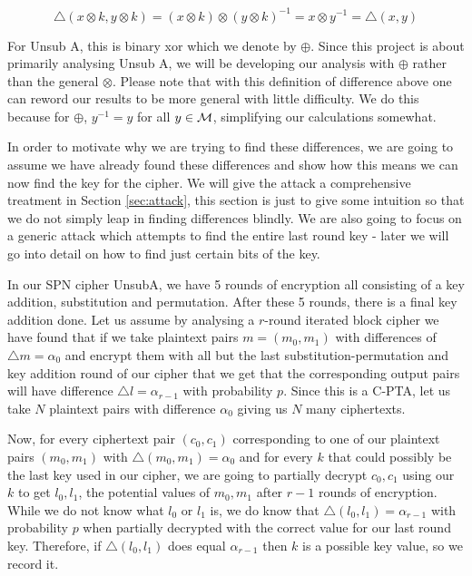 \documentclass[12pt,a4paper]{article}
\begin{document}
\[\triangle(x\otimes k,y\otimes k) = (x \otimes k) \otimes (y \otimes k)^{-1} =
x \otimes y^{-1} = \triangle(x,y)\]

For Unsub A, this is binary xor which we denote by $\oplus$. Since this project
is about primarily analysing Unsub A, we will be developing our analysis with
$\oplus$ rather than the general $\otimes$. Please note that with this
definition of difference above one can reword our results to be more general
with little difficulty. We do this because for $\oplus$, $y^{-1} = y$ for all
$y \in \cal{M}$, simplifying our calculations somewhat.

In order to motivate why we are trying to find these differences, we are going
to assume we have already found these differences and show how this means we
can now find the key for the cipher. We will give the attack a 
comprehensive treatment in Section \ref{sec:attack}, this section is just to give some
intuition so that we do not simply leap in finding differences blindly. We are
also going to focus on a generic attack which attempts to find the entire last
round key - later we will go into detail on how to find just certain bits of
the key.

In our SPN cipher UnsubA, we have 5 rounds of encryption all consisting of
a key addition, substitution and permutation. After these 5 rounds, there is a
final key addition done. Let us assume by analysing a $r$-round iterated block cipher we have
found that if we take plaintext pairs $m = (m_0,m_1)$ with differences of
$\triangle m=\alpha_0$
and encrypt them with all but the last substitution-permutation and key
addition round of our
cipher that we get that the corresponding output pairs will have difference
$\triangle l = \alpha_{r-1}$ with probability $p$.  Since this is a C-PTA, let us take $N$
plaintext pairs with difference $\alpha_0$ giving us $N$ many ciphertexts. 

Now, for every ciphertext pair $(c_0,c_1)$ corresponding to one of our
plaintext pairs $(m_0,m_1)$ with $\triangle(m_0,m_1) = \alpha_0$ and for every
$k$ that could possibly be the last key used in our cipher, we are going to
partially decrypt $c_0,c_1$ using our $k$ to get $l_0,l_1$, the potential
values of $m_0,m_1$ after $r-1$ rounds of encryption. While we do not know what
$l_0$ or $l_1$ is, we do know that $\triangle(l_0,l_1) = \alpha_{r-1}$ with
probability $p$ when partially decrypted  with the correct value for our last
round key. Therefore, if $\triangle(l_0,l_1)$ does equal $\alpha_{r-1}$ then
$k$ is a possible key value, so we record it.
\end{document}
